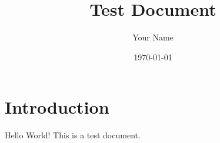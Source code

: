 \documentclass{article}
\title{Test Document}
\author{Your Name}
\date{\today}
\begin{document}
\maketitle

\section{Introduction}
Hello World! This is a test document.
\end{document}
